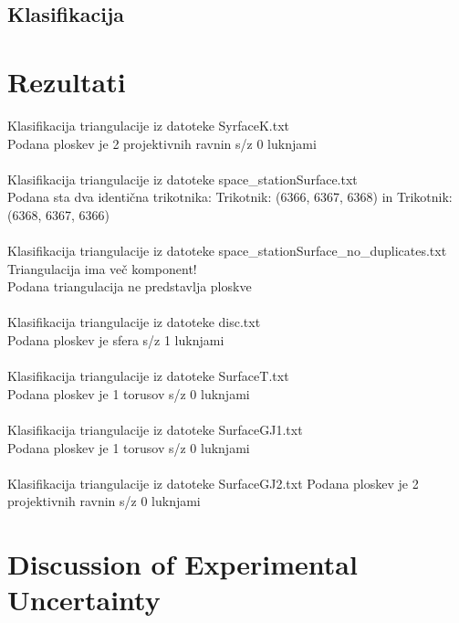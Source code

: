 \documentclass{article}
\begin{document}
\subsection{Klasifikacija}



\section{Rezultati}
Klasifikacija triangulacije iz datoteke SyrfaceK.txt \\
	Podana ploskev je 2 projektivnih ravnin s/z 0 luknjami
\\ \\
Klasifikacija triangulacije iz datoteke space\_stationSurface.txt \\
	Podana sta dva identična trikotnika: Trikotnik: (6366, 6367, 6368) in Trikotnik: (6368, 6367, 6366)
\\ \\
Klasifikacija triangulacije iz datoteke space\_stationSurface\_no\_duplicates.txt \\
	Triangulacija ima več komponent! \\
	Podana triangulacija ne predstavlja ploskve
\\ \\
Klasifikacija triangulacije iz datoteke disc.txt \\
	Podana ploskev je sfera s/z 1 luknjami
\\ \\
Klasifikacija triangulacije iz datoteke SurfaceT.txt \\
	Podana ploskev je 1 torusov s/z 0 luknjami
\\ \\
Klasifikacija triangulacije iz datoteke SurfaceGJ1.txt \\
	Podana ploskev je 1 torusov s/z 0 luknjami
\\ \\
Klasifikacija triangulacije iz datoteke SurfaceGJ2.txt
	Podana ploskev je 2 projektivnih ravnin s/z 0 luknjami



\section{Discussion of Experimental Uncertainty}
\end{document}
